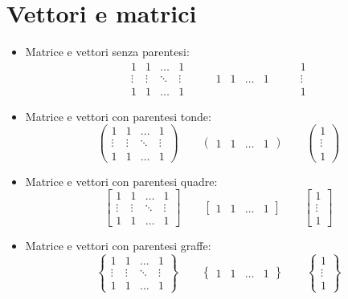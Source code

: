\documentclass[a4paper,12pt,oneside]{book}
\theoremstyle{plain}
\begin{document}
	\section{Vettori e matrici}
	\begin{itemize}
		\item Matrice e vettori senza parentesi:
		\[
		\begin{matrix}
			1 & 1 & \dots & 1\\
			\vdots & \vdots & \ddots & \vdots\\
			1 & 1 & \dots & 1
		\end{matrix} \qquad \begin{matrix}
			1 & 1 & \dots & 1
		\end{matrix} \qquad \begin{matrix}
			1\\
			\vdots\\
			1
		\end{matrix}
		\]
		
		\item Matrice e vettori con parentesi tonde:
		\[
		\begin{pmatrix}
			1 & 1 & \dots & 1\\
			\vdots & \vdots & \ddots & \vdots\\
			1 & 1 & \dots & 1
		\end{pmatrix} \qquad \begin{pmatrix}
			1 & 1 & \dots & 1
		\end{pmatrix} \qquad \begin{pmatrix}
			1\\
			\vdots\\
			1
		\end{pmatrix}
		\]
		
		\item Matrice e vettori con parentesi quadre:
		\[
		\begin{bmatrix}
			1 & 1 & \dots & 1\\
			\vdots & \vdots & \ddots & \vdots\\
			1 & 1 & \dots & 1
		\end{bmatrix} \qquad \begin{bmatrix}
			1 & 1 & \dots & 1
		\end{bmatrix} \qquad \begin{bmatrix}
			1\\
			\vdots\\
			1
		\end{bmatrix}
		\]
		
		\item Matrice e vettori con parentesi graffe:
		\[
		\begin{Bmatrix}
			1 & 1 & \dots & 1\\
			\vdots & \vdots & \ddots & \vdots\\
			1 & 1 & \dots & 1
		\end{Bmatrix} \qquad \begin{Bmatrix}
			1 & 1 & \dots & 1
		\end{Bmatrix} \qquad \begin{Bmatrix}
			1\\
			\vdots\\
			1
		\end{Bmatrix}
		\]
		

\end{itemize}
\end{document}
